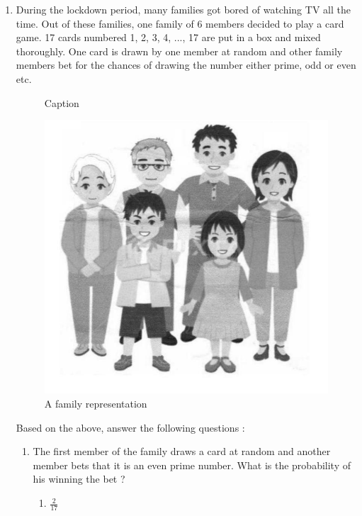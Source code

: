 \documentclass{article}
\begin{document}
\begin{enumerate}

\item During the lockdown period, many families got bored of watching TV all the time. Out of these families, one family of 6 members decided to play a card game. 17 cards numbered 1, 2, 3, 4, ..., 17 are put in a box and mixed thoroughly. One card is drawn by one member at random and other family members bet for the chances of drawing the number either prime, odd or even etc.     
	
	\begin{figure}[!h]
	\centering
	
	\caption{Caption}
	\label{fig:0}
        \end{figure}
	
	\begin{figure}[h!]
	\centering
	\includegraphics[width=\columnwidth]{figs/1.jpg}
	\caption{A family representation}
	\label{fig:1}
	\end{figure} 
Based on the above, answer the following questions : 		
\begin{enumerate}
\item The first member of the family draws a card at random and another member bets that it is an even prime number. What is the probability of his winning the bet ? 
	\begin{enumerate}
	\item $\frac{2}{17}$

\end{enumerate}
\end{enumerate}
\end{enumerate}
\end{document}
